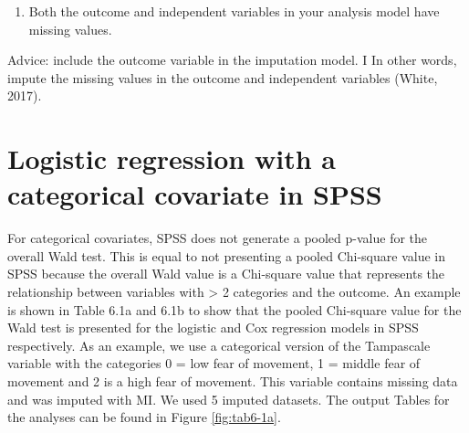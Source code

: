 \documentclass[]{book}
\providecommand{\tightlist}{%
  \setlength{\itemsep}{0pt}\setlength{\parskip}{0pt}}
\theoremstyle{definition}
\theoremstyle{definition}
\theoremstyle{definition}
\theoremstyle{remark}
\begin{document}
\begin{enumerate}
\def\labelenumi{\arabic{enumi}.}
\setcounter{enumi}{1}
\tightlist
\item
  Both the outcome and independent variables in your analysis model have
  missing values.
\end{enumerate}

Advice: include the outcome variable in the imputation model. I In other
words, impute the missing values in the outcome and independent
variables (White, 2017).

\section{Logistic regression with a categorical covariate in
SPSS}\label{logistic-regression-with-a-categorical-covariate-in-spss}

For categorical covariates, SPSS does not generate a pooled p-value for
the overall Wald test. This is equal to not presenting a pooled
Chi-square value in SPSS because the overall Wald value is a Chi-square
value that represents the relationship between variables with
\textgreater{} 2 categories and the outcome. An example is shown in
Table 6.1a and 6.1b to show that the pooled Chi-square value for the
Wald test is presented for the logistic and Cox regression models in
SPSS respectively. As an example, we use a categorical version of the
Tampascale variable with the categories 0 = low fear of movement, 1 =
middle fear of movement and 2 is a high fear of movement. This variable
contains missing data and was imputed with MI. We used 5 imputed
datasets. The output Tables for the analyses can be found in Figure
\ref{fig:tab6-1a}.
\end{document}
